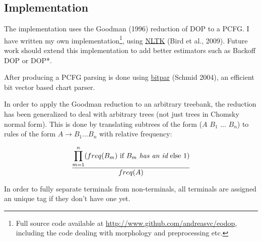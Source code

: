 \documentclass[10pt,a4paper]{article}
\begin{document}
\subsection{Implementation}

The implementation uses the Goodman (1996) reduction of DOP to a PCFG. I have
written my own
implementation\footnote{Full source code available at \url{http://www.github.com/andreasvc/eodop}, including the code dealing with morphology and preprocessing etc.}, using
\href{http://groups.google.com/group/nltk-dev/browse_thread/thread/86ca038723195978/c112b8d171b33d25}{NLTK} (Bird et al., 2009). Future work should extend
this implementation to add better estimators such as Backoff DOP or DOP*.

After producing a PCFG parsing is done using
\href{http://www.ims.uni-stuttgart.de/tcl/SOFTWARE/BitPar.html}{bitpar} 
(Schmid 2004), an efficient bit vector based chart parser.

%

In order to apply the Goodman reduction to an arbitrary treebank, the reduction
has been generalized to deal with arbitrary trees (not just trees in Chomsky
normal form). This is done by translating subtrees of the form 
($A$ $B_1$ ... $B_n$) to rules of the form $A \rightarrow B_1 ... B_n$ with
relative frequency:

\[
\frac{\displaystyle\prod_{m = 1}^n(
\text{$freq(B_m)$ if $B_m$ {\em has an id} else $1$})}{freq(A)}
\] 

\vspace{2em}
In order to fully separate terminals from non-terminals, all terminals are
assigned an unique tag if they don't have one yet.

\begin{comment}
Previously considered possibilities:

\begin{itemize}
\item \href{http://staff.science.uva.nl/~simaan/dopdis/}{dopdis} (C): already
has Goodman reduction and DOP*;
\item \href{http://sourceforge.net/projects/lilian/}{lilian} (Java): has
Goodman reduction, no DOP*; also has U-DOP.
\item Gideon Borensztajn's \href{http://staff.science.uva.nl/~gideon/sourcecode/DOPParser.tar.gz}{DOPParser} (Java): has Goodman reduction
\end{itemize}
\end{comment}
\end{document}
